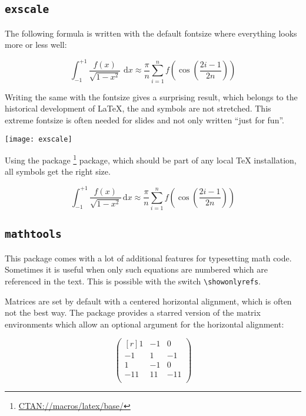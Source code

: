 \begin{table}[htb]
\subsection{\texttt{exscale}}\label{sec:exscale}

The following formula is written with the default fontsize where everything
looks more or less well:

\[
\int_{-1}^{+1}\frac{f(x)}{\sqrt{1-x^{2}}}\,%
\,\mathrm{d}x\approx\frac{\pi}{n}\sum_{i=1}^{n}f\left(\cos\left(\frac{2i-1}{2n}\right)\right)\]


Writing the same with the fontsize  gives
a surprising result, which belongs to the historical development of
\LaTeX{}, the  and  symbols
are not stretched. This extreme fontsize is often needed for slides
and not only written ``just for fun{}''.

\begin{center}
\texttt{[image: exscale]}
\end{center}

Using the  package%
\footnote{\href{http://www.ctan.org/tex-archive/macros/latex/base/}%
{CTAN://macros/latex/base/}} package, which should be part of any local \TeX{}
installation, all symbols get the right size.

\begin{minipage}[c]{1.0\textwidth}%
\centering\huge\[
\int_{-1}^{+1}\frac{f(x)}{\sqrt{1-x^{2}}}\,\mathrm{d}x\approx\frac{\pi}{n}%
\sum_{i=1}^{n}f\left(\cos\left(\frac{2i-1}{2n}\right)\right)\]
\end{minipage}%

\subsection{\texttt{mathtools}}\label{sec:mathtools}
This package comes with a lot of additional features for typesetting math code.
Sometimes it is useful when only such equations are numbered which are
referenced in the text. This is possible with the switch \verb+\showonlyrefs+.

Matrices are set by default with a centered horizontal alignment, which is
often not the best way. The  package provides a starred version of
the matrix environments which allow an optional argument for the horizontal
alignment:

\[
\begin{pmatrix*}[r]
  1 & -1 &  0 \\
 -1 &  1 & -1 \\
  1 & -1 &  0 \\
-11 & 11 &-11 \\
\end{pmatrix*}
\]


\end{table}
